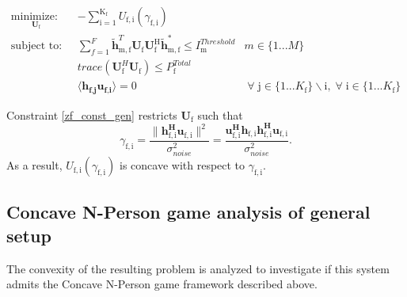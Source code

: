 \documentclass[12pt,a4paper]{report}
\begin{document}
	\begin{subequations}
	\label{optim}
	\begin{align}
	    \underset{\mathbf{U}_{\mathrm{f}} }{\text{minimize: }} \;
	    & - \sum_{\mathrm{i=1}}^{\mathrm{K_f}}
    	U_{\mathrm{f,i}}(\gamma_{\mathrm{f,i}}) \label{player_opt} \\
	    \text{subject to: } \; &
	   \sum^F_{f=1} \mathbf{\tilde{h}}_{\mathrm{m,f}}^T  \mathbf{U_{\mathrm{f}}}		
	\mathbf{U_{\mathrm{f}}^{\mathrm{H}}} \mathbf{\tilde{h}_{\mathrm{m,f}}^*} \leq I^{Threshold}		
	_{\mathrm{m}} & m \in \{1 ...M\} 
		\label{interference_const_gen}\\
        & trace(\mathbf{U}_{\text{f}}^H\mathbf{U}_{\text{f}}) \leq P^{Total}_{\text{f}} \label{power_const_gen}\\
        & \langle \mathbf{h_{\text{f,j}}}\mathbf{u_{\text{f,i}}} \rangle =0\ & \; \forall \; \text{j} \in \{1... K_{\text{f}}\}\backslash \text{i} ,\; \forall \; \text{i} \in \{1 ... K_{\text{f}}\} \label{zf_const_gen}
	\end{align}
	\end{subequations}


Constraint \eqref{zf_const_gen} restricts $\mathbf{U}_{\mathrm{f}}$ such that  
	\begin{equation}\label{zf_snr}
	\gamma_{\mathrm{f,i}} = \frac{\|\mathbf{h^H_{\mathrm{f,i}}u_{\mathrm{f,i}}}\|^2}
	{\sigma^2_{noise}  
	}
	= 
	\frac{\mathbf{u^H_{\mathrm{f,i}}h_{\mathrm{f,i}}h^H_{\mathrm{f,i}}u_{\mathrm{f,i}}}}
	{\sigma^2_{noise}  
	}.
	\end{equation}
	As a result, $U_{\mathrm{f,i}}(\gamma_{\mathrm{f,i}}) $ is concave with respect to $\gamma_{\mathrm{f,i}}$.
	
\subsection{Concave N-Person game analysis of general setup}
The convexity of the resulting problem is analyzed to investigate if this system admits the Concave N-Person game framework described above. 
\end{document}
